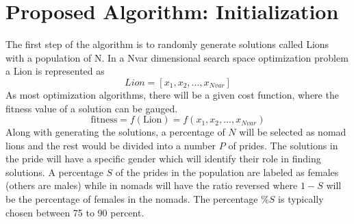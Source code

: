 \section{Proposed Algorithm: Initialization}
The first step of the algorithm is to randomly generate solutions called Lions with a population of N. In a Nvar dimensional search space optimization problem a Lion is represented as
$$Lion = [x_1, x_2,..., x_{Nvar}]$$
As most optimization algorithms, there will be a given cost function, where the fitness value of a solution can be gauged.
$$\text{fitness} = f(\text{Lion}) = f(x_1, x_2,..., x_{Nvar})$$
Along with generating the solutions, a percentage of $N$ will be selected as nomad lions and the rest would be divided into a number $P$ of prides. The solutions in the pride will have a specific gender which will identify their role in finding solutions. A percentage $S$ of the prides in the population are labeled as females (others are males) while in nomads will have the ratio reversed where $1-S$ will be the percentage of females in the nomads. The percentage $\%S$ is typically chosen between 75 to 90 percent.

